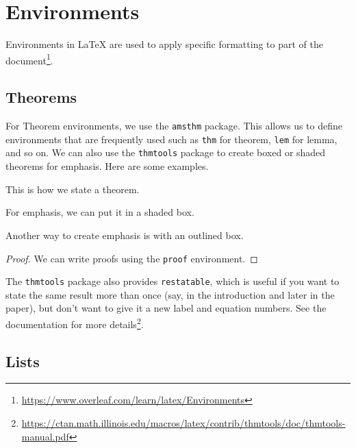 \chapter{Environments}

Environments in LaTeX are used to apply specific formatting to part of the document\footnote{\url{https://www.overleaf.com/learn/latex/Environments}}.


\section{Theorems}

For Theorem environments, we use the \verb|amsthm| package. This allows us to define environments that are frequently used such as \verb|thm| for theorem, \verb|lem| for lemma, and so on. We can also use the \verb|thmtools| package to create boxed or shaded theorems for emphasis. Here are some examples.

\begin{theorem}[A theorem]
	\label{thm:big_result1}
	This is how we state a theorem.
\end{theorem}

\begin{theoremshaded}[Shaded]
	\label{thm:big_result2}
	For emphasis, we can put it in a shaded box.
\end{theoremshaded}

\begin{theoremboxed}[Outlined]
	\label{thm:big_result3}
	Another way to create emphasis is with an outlined box.
\end{theoremboxed}

\begin{proof}
We can write proofs using the \verb|proof| environment.
\end{proof}

The \verb|thmtools| package also provides \verb|restatable|, which is useful if you want to state the same result more than once (say, in the introduction and later in the paper), but don't want to give it a new label and equation numbers. See the documentation for more details\footnote{\url{https://ctan.math.illinois.edu/macros/latex/contrib/thmtools/doc/thmtools-manual.pdf}}.


\section{Lists}

